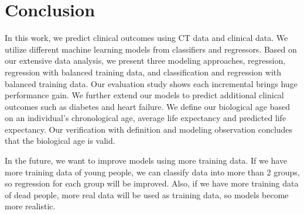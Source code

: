 \section{Conclusion}
\label{sec:conclusion}

In this work, we predict clinical outcomes using CT data and clinical data.
We utilize different machine learning models from classifiers and regressors.
Based on our extensive data analysis, we present three modeling approaches, regression, regression with balanced training data, and classification and regression with balanced training data.
Our evaluation study shows each incremental brings huge performance gain.
We further extend our models to predict additional clinical outcomes such as diabetes and heart failure.
We define our biological age based on an individual's chronological age, average life expectancy and predicted life expectancy.
Our verification with definition and modeling observation concludes that the biological age is valid.

In the future, we want to improve models using more training data. If we have more training data of young people, we can classify data into more than 2 groups, so regression for each group will be improved. Also, if we have more training data of dead people, more real data will be used as training data, so models become more realistic.